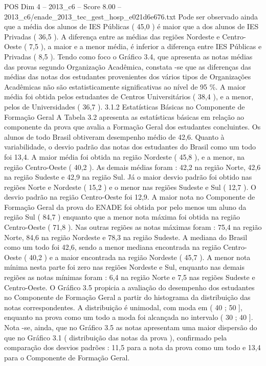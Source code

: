 \begin{textsample}{POS Dim 4 – 2013\_c6 – Score 8.00 – 2013\_c6/enade\_2013\_tec\_gest\_hosp\_e021d6e676.txt}
Pode ser observado ainda que a média dos alunos de IES Públicas ( 45,0 ) é maior que a dos alunos de IES Privadas ( 36,5 ).
A diferença entre as médias das regiões Nordeste e Centro-Oeste ( 7,5 ), a maior e a menor média, é inferior a diferença entre IES Públicas e Privadas ( 8,5 ).
Tendo como foco o Gráfico 3.4, que apresenta as notas médias das provas segundo Organização Acadêmica, constata -se que as diferenças das médias das notas dos estudantes provenientes dos vários tipos de Organizações Acadêmicas não são estatisticamente significativas ao nível de 95 \%.
A maior média foi obtida pelos estudantes de Centros Universitários ( 38,4 ), e a menor, pelos de Universidades ( 36,7 ). 3.1.2 Estatísticas Básicas no Componente de Formação Geral A Tabela 3.2 apresenta as estatísticas básicas em relação ao componente da prova que avalia a Formação Geral dos estudantes concluintes.
Os alunos de todo Brasil obtiveram desempenho médio de 42,6.
Quanto à variabilidade, o desvio padrão das notas dos estudantes do Brasil como um todo foi 13,4.
A maior média foi obtida na região Nordeste ( 45,8 ), e a menor, na região Centro-Oeste ( 40,2 ).
As demais médias foram : 42,2 na região Norte, 42,6 na região Sudeste e 42,9 na região Sul.
Já o maior desvio padrão foi obtido nas regiões Norte e Nordeste ( 15,2 ) e o menor nas regiões Sudeste e Sul ( 12,7 ).
O desvio padrão na região Centro-Oeste foi 12,9.
A maior nota no Componente de Formação Geral da prova do ENADE foi obtida por pelo menos um aluno da região Sul ( 84,7 ) enquanto que a menor nota máxima foi obtida na região Centro-Oeste ( 71,8 ).
Nas outras regiões as notas máximas foram : 75,4 na região Norte, 84,6 na região Nordeste e 78,3 na região Sudeste.
A mediana do Brasil como um todo foi 42,6, sendo a menor mediana encontrada na região Centro-Oeste ( 40,2 ) e a maior encontrada na região Nordeste ( 45,7 ).
A menor nota mínima nesta parte foi zero nas regiões Nordeste e Sul, enquanto nas demais regiões as notas mínimas foram : 6,4 na região Norte e 7,5 nas regiões Sudeste e Centro-Oeste.
O Gráfico 3.5 propicia a avaliação do desempenho dos estudantes no Componente de Formação Geral a partir do histograma da distribuição das notas correspondentes.
A distribuição é unimodal, com moda em ( 40 ; 50 ], enquanto na prova como um todo a moda foi alcançada no intervalo ( 30 ; 40 ].
Nota -se, ainda, que no Gráfico 3.5 as notas apresentam uma maior dispersão do que no Gráfico 3.1 ( distribuição das notas da prova ), confirmado pela comparação dos desvios padrões : 11,5 para a nota da prova como um todo e 13,4 para o Componente de Formação Geral.

\end{textsample}
